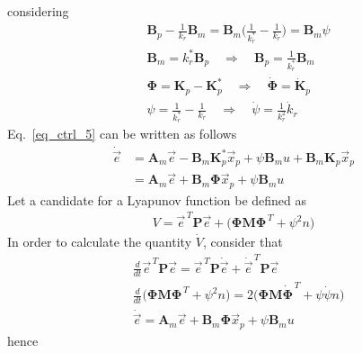 \documentclass[11pt,a4paper,oneside]{book}
\numberwithin{equation}{section}
\theoremstyle{it}
\theoremstyle{definition}
\begin{document}
considering 
\begin{align}\label{eq_ctrl_6}
	&\mathbf{B}_p-\frac{1}{k_r}\mathbf{B}_m=\mathbf{B}_m\Big(\frac{1}{k_r^*}-\frac{1}{k_r}\Big) = \mathbf{B}_m\psi\\[6pt]
	&\mathbf{B}_m = k_r^*\mathbf{B}_p\quad\Rightarrow\quad\mathbf{B}_p = \frac{1}{k_r^*}\mathbf{B}_m \\[6pt]
	&\mathbf{\Phi} = \mathbf{K}_p -\mathbf{K}_p^* \quad\Rightarrow\quad\dot{\mathbf{\Phi}}= \dot{\mathbf{K}}_p \\[6pt]
	&{\psi} = \frac{1}{k_r^*}-\frac{1}{k_r} \quad\Rightarrow\quad \dot{\psi}=\frac{1}{k_r^2}\dot{k}_r
\end{align}
Eq.~\ref{eq_ctrl_5} can be written as follows
\begin{equation}\label{eq_ctrl_7}
	\begin{aligned}
		\dot{\vec{e}} &= \mathbf{A}_m\vec{e}-\mathbf{B}_m\mathbf{K}_p^*\vec{x}_p + \psi \mathbf{B}_m u + \mathbf{B}_m\mathbf{K}_p\vec{x}_p  \\[6pt]
		&= \mathbf{A}_m\vec{e}+\mathbf{B}_m\mathbf{\Phi}\vec{x}_p + \psi \mathbf{B}_m u
	\end{aligned}
\end{equation}
Let a candidate for a Lyapunov function be defined as 
\begin{equation}\label{eq_ctrl_8}
	\begin{aligned}
		V=\vec{e}^{\,T}\mathbf{P}\vec{e} + \Big(\mathbf{\Phi}\mathbf{M}\mathbf{\Phi}^{\,T} + \psi^2n\Big)
	\end{aligned}
\end{equation}
In order to calculate the quantity $\dot{V}$, consider that
\begin{equation*}
	\begin{aligned}
		&\frac{d}{dt}\vec{e}^{\,T}\mathbf{P}\vec{e} = \vec{e}^{\,T}\mathbf{P}\dot{\vec{e}} + \dot{\vec{e}}^{\,T}\mathbf{P}\vec{e} \\[6pt]
		&\frac{d}{dt}\Big(\mathbf{\Phi}\mathbf{M}\mathbf{\Phi}^{\,T} + \psi^2n\Big) = 2\Big(\mathbf{\Phi}\mathbf{M}\dot{\mathbf{\Phi}}^{\,T} + \psi\dot{\psi}n\Big)  \\[6pt]
		&\dot{\vec{e}} = \mathbf{A}_m\vec{e}+\mathbf{B}_m\mathbf{\Phi}\vec{x}_p + \psi \mathbf{B}_m u
	\end{aligned}
\end{equation*}
hence
\end{document}
